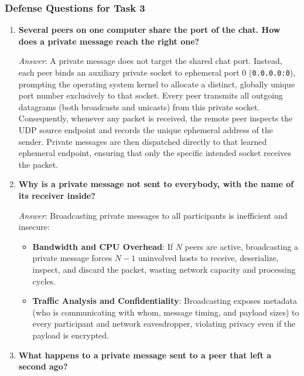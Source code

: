 \documentclass[11pt,a4paper]{article}
\begin{document}
\subsubsection{Defense Questions for Task 3}
\begin{enumerate}[label=\textbf{Q\arabic*.}, leftmargin=*]
    \item \textbf{Several peers on one computer share the port of the chat. How does a private message reach the right one?}
    
    \textit{Answer}: A private message does not target the shared chat port. Instead, each peer binds an auxiliary private socket to ephemeral port 0 (\texttt{0.0.0.0:0}), prompting the operating system kernel to allocate a distinct, globally unique port number exclusively to that socket. Every peer transmits all outgoing datagrams (both broadcasts and unicasts) from this private socket. Consequently, whenever any packet is received, the remote peer inspects the UDP source endpoint and records the unique ephemeral address of the sender. Private messages are then dispatched directly to that learned ephemeral endpoint, ensuring that only the specific intended socket receives the packet.

    \item \textbf{Why is a private message not sent to everybody, with the name of its receiver inside?}
    
    \textit{Answer}: Broadcasting private messages to all participants is inefficient and insecure:
    \begin{itemize}[noitemsep]
        \item \textbf{Bandwidth and CPU Overhead}: If $N$ peers are active, broadcasting a private message forces $N-1$ uninvolved hosts to receive, deserialize, inspect, and discard the packet, wasting network capacity and processing cycles.
        \item \textbf{Traffic Analysis and Confidentiality}: Broadcasting exposes metadata (who is communicating with whom, message timing, and payload sizes) to every participant and network eavesdropper, violating privacy even if the payload is encrypted.
    \end{itemize}

    \item \textbf{What happens to a private message sent to a peer that left a second ago?}
    

\end{enumerate}
\end{document}

